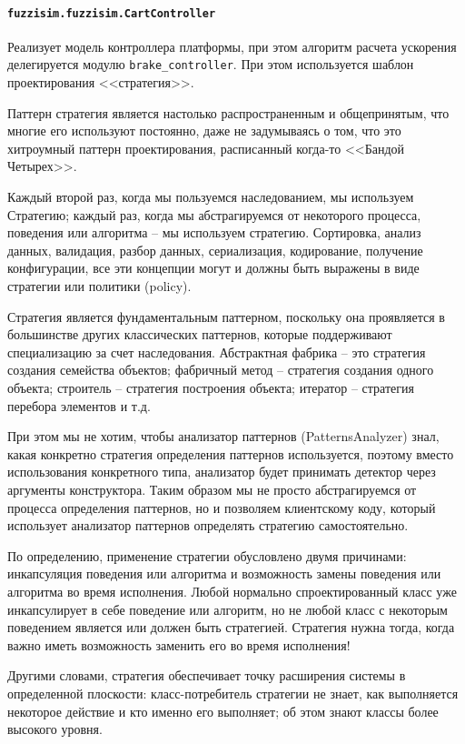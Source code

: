 \paragraph{\lstinline!fuzzisim.fuzzisim.CartController!}


Реализует модель контроллера платформы, при этом алгоритм расчета ускорения делегируется модулю \lstinline!brake_controller!. При этом используется шаблон проектирования <<стратегия>>.

Паттерн стратегия является настолько распространенным и общепринятым, что многие его используют постоянно, даже не задумываясь о том, что это хитроумный паттерн проектирования, расписанный когда-то <<Бандой Четырех>>.

Каждый второй раз, когда мы пользуемся наследованием, мы используем Стратегию; каждый раз, когда мы абстрагируемся от некоторого процесса, поведения или алгоритма – мы используем стратегию. Сортировка, анализ данных, валидация, разбор данных, сериализация, кодирование, получение конфигурации, все эти концепции могут и должны быть выражены в виде стратегии или политики (policy).

Стратегия является фундаментальным паттерном, поскольку она проявляется в большинстве других классических паттернов, которые поддерживают специализацию за счет наследования. Абстрактная фабрика – это стратегия создания семейства объектов; фабричный метод – стратегия создания одного объекта; строитель – стратегия построения объекта; итератор – стратегия перебора элементов и т.д.

При этом мы не хотим, чтобы анализатор паттернов (PatternsAnalyzer) знал, какая конкретно стратегия определения паттернов используется, поэтому вместо использования конкретного типа, анализатор будет принимать детектор через аргументы конструктора. Таким образом мы не просто абстрагируемся от процесса определения паттернов, но и позволяем клиентскому коду, который использует анализатор паттернов определять стратегию самостоятельно.

По определению, применение стратегии обусловлено двумя причинами:  инкапсуляция поведения или алгоритма и  возможность замены поведения или алгоритма во время исполнения. Любой нормально спроектированный класс уже инкапсулирует в себе поведение или алгоритм, но не любой класс с некоторым поведением является или должен быть стратегией. Стратегия нужна тогда, когда важно иметь возможность заменить его во время исполнения!

Другими словами, стратегия обеспечивает точку расширения системы в определенной плоскости: класс-потребитель стратегии не знает, как выполняется некоторое действие и кто именно его выполняет; об этом знают классы более высокого уровня.

